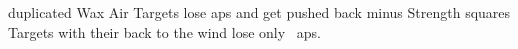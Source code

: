 
  {duplicated}%
  {Wax}%
  {Air}%
  {}%
  {Targets lose  \glspl{ap} and get pushed back  minus Strength squares}%
  {Targets with their back to the wind lose only
  \setcounter{track}{\value{spellCost}}%
  ~\glspl{ap}.}
